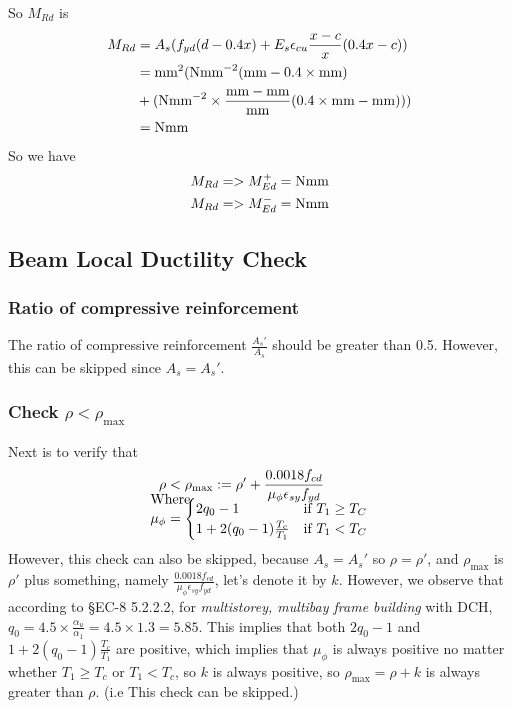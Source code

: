 So $M_{Rd}$ is
\begin{align*}
  M_{Rd} &= A_{s} (f_{yd} (d - 0.4 x) +
           E_{s} \epsilon_{cu} \frac{x-c}{x} (0.4x - c)) \\
         &=
           \g{As} \mbox{mm}^{2}(
           \g{fyd} \mbox{Nmm}^{-2}
           (\g{d} \mbox{mm} - 0.4 \times \g{x}\mbox{mm}) \\
           &+
           (
           \g{Es} \mbox{Nmm}^{-2} \times \g{epcu}
           \frac{\g{x} \mbox{mm}- \g{c} \mbox{mm}}
           {\g{x} \mbox{mm}}
           (0.4 \times \g{x} \mbox{mm} - \g{c} \mbox{mm})
           )) \\
  &= \g{MRd} \mbox{Nmm}
\end{align*}
So we have
\begin{align*}
  M_{Rd} &= \g{MRd} > M_{Ed}^{+} = \g{MEd} \mbox{Nmm}\\
  M_{Rd} &= \g{MRd} > M_{Ed}^{-} = \g{MEdl} \mbox{Nmm}
\end{align*}
\subsection{Beam Local Ductility Check}
\subsubsection{Ratio of compressive reinforcement}
The ratio of compressive reinforcement $\frac{A_{s}'}{A_{s}}$ should be greater
than 0.5. However, this can be skipped since \(A_{s} = A_{s}'\).

\subsubsection{Check $\rho < \rho_{\max}$}
Next is to verify that
\begin{align*}
  \rho &< \rho_{\max} := \rho' +
         \frac{0.0018f_{cd}}{\mu_{\phi}\epsilon_{sy}f_{yd}}\\
  \\[-1cm]               %
  \intertext{Where}
  \\[-1cm]               %
  \mu_{\phi} &=
               \begin{cases}
                 2q_{0} - 1 & \text{if } T_1 \geq T_{C} \\
                 1 + 2(q_{0} - 1)\frac{T_c}{T_1} & \text{if } T_{1} < T_{C}
               \end{cases}
\end{align*}
However, this check can also be skipped, because $A_s = A_s'$ so $\rho = \rho'$,
and $\rho_{\max}$ is $\rho'$ plus something, namely
$\frac{0.0018f_{cd}}{\mu_{\phi}\epsilon_{sy}f_{yd}}$, let's denote it by $k$.
However, we observe that according to \S EC-8 5.2.2.2, for \emph{multistorey,
  multibay frame building} with DCH, $q_0 = 4.5 \times \frac{\alpha_u}{\alpha_1}
= 4.5 \times 1.3 = 5.85$. This implies that both $2q_0-1$ and
$1+2(q_0-1)\frac{T_c}{T_1}$ are positive, which implies that $\mu_{\phi}$ is
always positive no matter whether $T_1 \geq T_c$ or $T_1 < T_c$, so $k$ is
always positive, so $\rho_{\max} = \rho + k$ is always greater than $\rho$. (i.e
This check can be skipped.)

